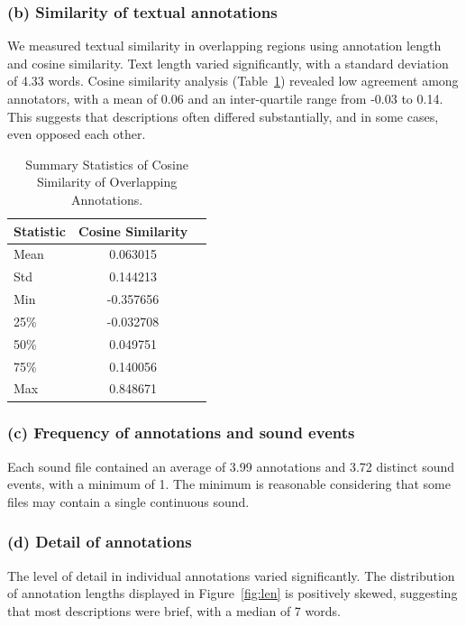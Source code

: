 \documentclass[runningheads]{llncs}
\begin{document}
\subsubsection{(b) Similarity of textual annotations}
We measured textual similarity in overlapping regions using annotation length and cosine similarity. Text length varied significantly, with a standard deviation of 4.33 words.
Cosine similarity analysis (Table~\ref{tab:cos}) revealed low agreement among annotators, with a mean of 0.06 and an inter-quartile range from -0.03 to 0.14. This suggests that descriptions often differed substantially, and in some cases, even opposed each other.  

\begin{table}[h]
    \caption{Summary Statistics of Cosine Similarity of Overlapping Annotations.}
    \label{tab:cos}
    \centering
    \begin{tabular}{lcl}
        \toprule
        Statistic & Cosine Similarity \\ \midrule
        Mean            & 0.063015 \\
        Std             & 0.144213 \\
        Min             & -0.357656 \\
        25\%            & -0.032708 \\
        50\%            & 0.049751 \\
        75\%            & 0.140056 \\ 
        Max             & 0.848671 \\ \bottomrule
    \end{tabular}
\end{table}

\subsubsection{(c) Frequency of annotations and sound events}
Each sound file contained an average of 3.99 annotations and 3.72 distinct sound events, with a minimum of 1. The minimum is reasonable considering that some files may contain a single continuous sound.

\subsubsection{(d) Detail of annotations}
The level of detail in individual annotations varied significantly. The distribution of annotation lengths displayed in Figure~\ref{fig:len} is positively skewed, suggesting that most descriptions were brief, with a median of 7 words.
\end{document}
